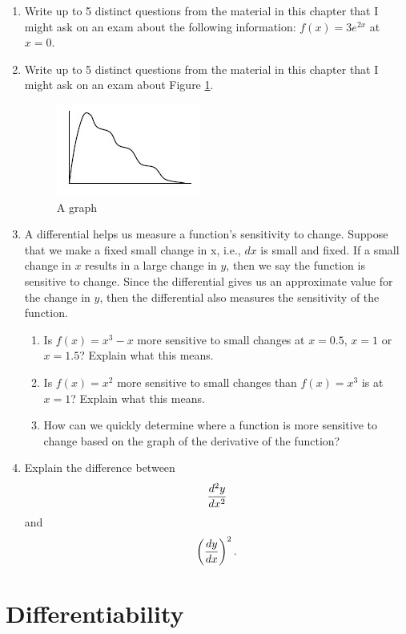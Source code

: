 \begin{enumerate}
\item  Write up to 5 distinct questions from the material in this chapter that I might ask on an exam about the following information:  $f(x) = 3e^{2x}$ at $x = 0$.

\item  Write up to 5 distinct questions from the material in this chapter that I might ask on an exam about Figure \ref{Chapter3Figurea}. %

\begin{figure}[ht]
	\centering
		\includegraphics{TeXGraphics/Chapter3Fig.jpg}
	\caption{A graph}
	\label{Chapter3Figurea}
\end{figure}

\item  A differential helps us measure a function's sensitivity to change.  Suppose that we make a fixed small change in x, i.e., $dx$ is small and fixed.  If a small change in $x$ results in a large change in $y$, then we say the function is sensitive to change.  Since the differential gives us an approximate value for the change in $y$, then the differential also measures the sensitivity of the function. \begin{enumerate}


\item  Is $f(x) = x^3 - x$ more sensitive to small changes at $x = 0.5$, $x = 1$ or $x = 1.5$?  Explain what this means.


\item  Is $f(x) = x^2$ more sensitive to small changes than $f(x) = x^3$ is at $x = 1$?  Explain what this means.


\item  How can we quickly determine where a function is more sensitive  to change based on the graph of the derivative of the function? \end{enumerate}

\item  Explain the difference between $${{d^2 y} \over {dx^2 }}$$ and $$\left( {{{dy} \over {dx}}} \right)^2 .$$\end{enumerate}\section{Differentiability}\begin{enumerate}


\end{enumerate}
